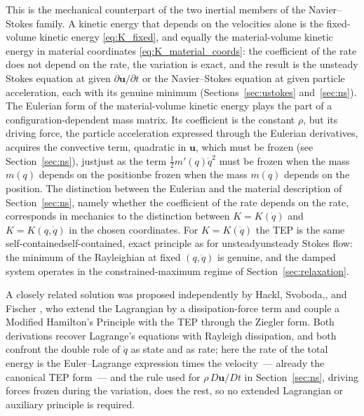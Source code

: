 \documentclass[12pt]{article}
\newif\ifhighlight \highlightfalse
\newif\ifhighlightfirst \highlightfirstfalse
\DeclareRobustCommand{\chg}[1]{\ifhighlight\ifhighlightfirst\textcolor{revised}{#1}\else#1\fi\else#1\fi}
\DeclareRobustCommand{\chgb}[1]{\ifhighlight\textcolor{revisedb}{#1}\else#1\fi}
\begin{document}
This is the mechanical counterpart of the two inertial members of the Navier--Stokes family. A kinetic energy that depends on the velocities alone is the fixed-volume kinetic energy \eqref{eq:K_fixed}, and equally the material-volume kinetic energy in material coordinates \eqref{eq:K_material_coords}: the coefficient of the rate does not depend on the rate, the variation is exact, and the result is the unsteady Stokes equation at given $\partial\boldsymbol{u}/\partial t$ or the Navier--Stokes equation at given particle acceleration, each with its genuine minimum (Sections~\ref{sec:ustokes} and~\ref{sec:ns}). The Eulerian form of the material-volume kinetic energy plays the part of a configuration-dependent mass matrix. Its coefficient is the constant $\rho$, but its driving force, the particle acceleration expressed through the Eulerian derivatives, acquires the convective term, quadratic in $\boldsymbol{u}$, which must be frozen (\chgb{see} Section~\ref{sec:ns}), \chg{just} as the term $\tfrac{1}{2} m'(q)\dot{q}^2$ must \chg{be frozen when the mass $m(q)$ depends on the position}. The distinction between the Eulerian and the material description of Section~\ref{sec:ns}, namely whether the coefficient of the rate depends on the rate, corresponds in mechanics to the distinction between $K = K(\dot{q})$ and $K = K(q, \dot{q})$ in the chosen coordinates. For $K = K(\dot{q})$ the TEP is the same \chg{self-contained}, exact principle as for \chg{unsteady} Stokes flow: the minimum of the Rayleighian at fixed $(q, \ddot{q})$ is genuine, and the damped system operates in the constrained-maximum regime of Section~\ref{sec:relaxation}.

A closely related \chgb{solution} was proposed independently by Hackl, Svoboda\chg{,} and Fischer \cite{hackl2024coupling}, who extend the Lagrangian by a dissipation-force term and couple a Modified Hamilton's Principle with the TEP through the Ziegler form. Both derivations recover Lagrange's equations with Rayleigh dissipation, and both confront the double role of $\dot{q}$ as state and as rate; here the rate of the total energy is the Euler--Lagrange expression times the velocity~--- already the canonical TEP form~--- and the rule used for $\rho\, D\boldsymbol{u}/Dt$ in Section~\ref{sec:ns}, driving forces frozen during the variation, does the rest, so no extended Lagrangian or auxiliary principle is required.
\end{document}
